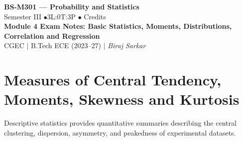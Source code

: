 \documentclass[12pt,a4paper]{article}
\begin{document}
\begin{center}
  {\LARGE\bfseries\color{myred} BS-M301 --- Probability and Statistics}\\[5pt]
  {\normalsize\color{mydark} Semester III \quad$\bullet$\quad 3L:0T:3P \quad$\bullet$ Credits}\\[3pt]
  {\normalsize\color{myteal}\textbf{Module 4 Exam Notes: Basic Statistics, Moments, Distributions, Correlation and Regression}}\\[3pt]
  {\small\color{mydark} CGEC \;$|$\; B.Tech ECE (2023--27) \;$|$\; \textit{Biraj Sarkar}}
\end{center}
\vspace{2pt}
\noindent{\color{myred}\rule{\linewidth}{1.5pt}}
\vspace{2pt}

\hypersetup{linkcolor=mydark}
\tableofcontents
\hypersetup{linkcolor=myteal}
\newpage

\section{Measures of Central Tendency, Moments, Skewness and Kurtosis}

Descriptive statistics provides quantitative summaries describing the central clustering, dispersion, asymmetry, and peakedness of experimental datasets.
\end{document}

